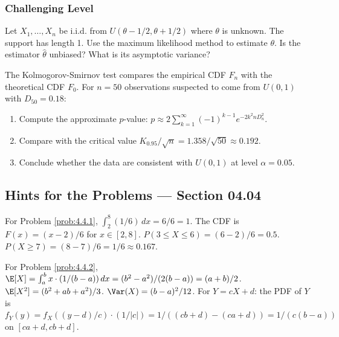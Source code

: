 \subsubsection*{Challenging Level}

\begin{problema}
	\label{prob:4.4.9}
	Let $X_{1}, \dots, X_{n}$ be i.i.d. from $U(\theta - 1/2, \theta + 1/2)$ where $\theta$ is unknown. The support has length 1. Use the maximum likelihood method to estimate $\theta$. Is the estimator $\hat{\theta}$ unbiased? What is its asymptotic variance?
\end{problema}

\begin{problema}
	\label{prob:4.4.10}
	The Kolmogorov-Smirnov test compares the empirical CDF $F_{n}$ with the theoretical CDF $F_{0}$. For $n = 50$ observations suspected to come from $U(0, 1)$ with $D_{50} = 0.18$:
	\begin{enumerate}
		\item Compute the approximate $p$-value: $p \approx 2 \sum_{k=1}^{\infty}(-1)^{k-1} e^{-2k^{2}n D_{n}^{2}}$.
		\item Compare with the critical value $K_{0.95}/\sqrt{n} = 1.358/\sqrt{50} \approx 0.192$.
		\item Conclude whether the data are consistent with $U(0, 1)$ at level $\alpha = 0.05$.
	\end{enumerate}
\end{problema}

\subsection*{Hints for the Problems --- Section 04.04}

\begin{sugerencia}
	\label{sug:4.4.1}
	For Problem \ref{prob:4.4.1}, $\int_{2}^{8} (1/6)\,dx = 6/6 = 1$. The CDF is $F(x) = (x-2)/6$ for $x \in [2, 8]$. $P(3 \le X \le 6) = (6-2)/6 = 0.5$. $P(X \ge 7) = (8-7)/6 = 1/6 \approx 0.167$.
\end{sugerencia}

\begin{sugerencia}
	\label{sug:4.4.2}
	For Problem \ref{prob:4.4.2}, $\E[X] = \int_{a}^{b} x \cdot (1/(b-a))\,dx = (b^{2} - a^{2})/(2(b-a)) = (a+b)/2$. $\E[X^{2}] = (b^{2} + ab + a^{2})/3$. $\Var(X) = (b-a)^{2}/12$. For $Y = cX + d$: the PDF of $Y$ is $f_{Y}(y) = f_{X}((y-d)/c) \cdot (1/|c|) = 1/((cb+d)-(ca+d)) = 1/(c(b-a))$ on $[ca+d, cb+d]$.
\end{sugerencia}

